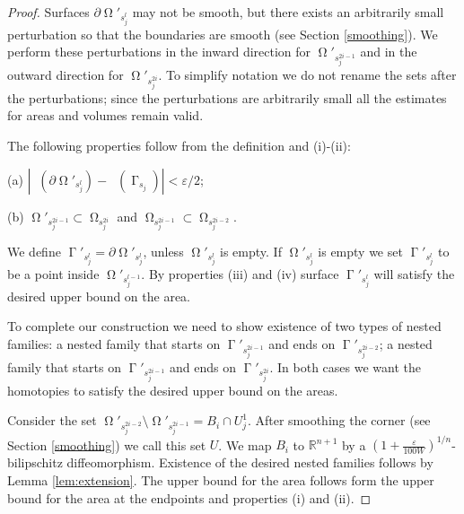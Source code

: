 \documentclass[12pt]{amsart}
\DeclareMathOperator{\Hn}{\mathcal{H}^n}
\DeclareMathOperator{\G}{\Gamma}
\DeclareMathOperator{\Om}{\Omega}
\theoremstyle{definition}
\begin{document}
\begin{proof}
Surfaces $\partial \Om'_{s_j^{l}}$ may not be smooth,
but there exists an arbitrarily small perturbation so that the boundaries are smooth
(see Section \ref*{smoothing}).
We perform these perturbations in the inward direction for $\Om'_{s_j ^{2i-1}}$
and in the outward direction for $\Om'_{s_j ^{2i}}$. 
To simplify notation we do not rename the sets after the perturbations;
since the perturbations are arbitrarily small all the estimates 
for areas and volumes remain valid.

The following properties follow from the definition and (i)-(ii):


(a) $|\Hn(\partial \Om'_{s_j^{l}}) - \Hn(\G_{s_j})|< \varepsilon/2$;

(b) $\Om'_{s_j ^{2i-1}} \subset \Om_{s_j ^{2i}}$ and
$\Om_{s_j ^{2i-1}} \subset \Om_{s_j ^{2i-2}}$.


We define $\G'_{s_j^{l}} = \partial \Om'_{s_j^{l}}$, unless
$\Om'_{s_j^{l}}$ is empty. If $\Om'_{s_j^{l}}$ is empty we
set $\G'_{s_j^{l}}$ to be a point inside $\Om'_{s_j^{l-1}}$.
By properties (iii) and (iv) surface $\G'_{s_j^{l}}$
will satisfy the desired upper bound on the area.

To complete our construction we need to show 
existence of two types of nested families:
a nested family that starts on $\G'_{s_j^{2i-1}}$
and ends on $\G'_{s_j^{2i-2}}$;
a nested family that starts on $\G'_{s_j^{2i-1}}$
and ends on $\G'_{s_j^{2i}}$.
In both cases we want the homotopies to 
satisfy the desired upper bound on the areas.

Consider the set $\Om'_{s_j^{2i-2}} \setminus \Om'_{s_j^{2i-1}} 
= B_i \cap U_j^1$.
After smoothing the corner (see Section \ref*{smoothing})
we call this set $U$.
We map $B_{i}$ to $\mathbb{R}^{n+1}$ by 
a $(1+\frac{\varepsilon}{100W})^{1/n}$-bilipschitz 
diffeomorphism. 
Existence of the desired nested families
follows by Lemma \ref*{lem:extension}.
The upper bound for the area follows form the upper bound
for the area at the endpoints and properties (i) and (ii).
%
\end{proof}
\end{document}
